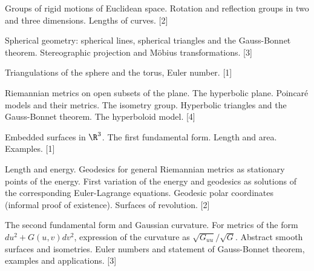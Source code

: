 \documentclass[a4paper]{article}
\begin{document}
\maketitle
{\small
\noindent Groups of rigid motions of Euclidean space. Rotation and reflection groups in two and three dimensions. Lengths of curves.\hspace*{\fill} [2]

\vspace{5pt}
\noindent Spherical geometry: spherical lines, spherical triangles and the Gauss-Bonnet theorem. Stereographic projection and M\"obius transformations.\hspace*{\fill} [3]

\vspace{5pt}
\noindent Triangulations of the sphere and the torus, Euler number.\hspace*{\fill} [1]

\vspace{5pt}
\noindent Riemannian metrics on open subsets of the plane. The hyperbolic plane. Poincar\'e models and their metrics. The isometry group. Hyperbolic triangles and the Gauss-Bonnet theorem. The hyperboloid model.\hspace*{\fill} [4]

\vspace{5pt}
\noindent Embedded surfaces in $\R^3$. The first fundamental form. Length and area. Examples.\hspace*{\fill} [1]

\vspace{5pt}
\noindent Length and energy. Geodesics for general Riemannian metrics as stationary points of the energy. First variation of the energy and geodesics as solutions of the corresponding Euler-Lagrange equations. Geodesic polar coordinates (informal proof of existence). Surfaces of revolution.\hspace*{\fill} [2]

\vspace{5pt}
\noindent The second fundamental form and Gaussian curvature. For metrics of the form $du^2 + G(u, v) dv^2$, expression of the curvature as $\sqrt{G_{uu}}/\sqrt{G}$. Abstract smooth surfaces and isometries. Euler numbers and statement of Gauss-Bonnet theorem, examples and applications.\hspace*{\fill} [3]}

\tableofcontents
\end{document}
